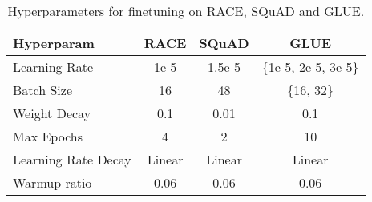 \begin{table*}[t]
\begin{center}
\begin{tabular}{lccc}
\toprule
\bf Hyperparam  & \bf RACE & \bf SQuAD & \bf GLUE \\
\midrule 
Learning Rate & 1e-5 & 1.5e-5 & \{1e-5, 2e-5, 3e-5\}\\
Batch Size & 16 & 48  & \{16, 32\}\\
Weight Decay & 0.1 & 0.01 & 0.1 \\
Max Epochs & 4 & 2 & 10 \\
Learning Rate Decay & Linear &Linear & Linear \\
Warmup ratio & 0.06 & 0.06 & 0.06 \\
\bottomrule
\end{tabular}
\end{center}
\caption{
Hyperparameters for finetuning \ourmodellarge{} on RACE, SQuAD and GLUE.
}
\label{tab:roberta_glue_finetune_hyperparams}
\end{table*}